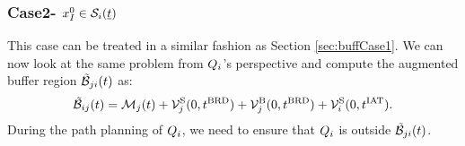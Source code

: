 \subsubsection{Case2- $x_{I}^0 \in \mathcal{S}_i(\underline{t})$} \label{sec:buffCase2}
This case can be treated in a similar fashion as Section \ref{sec:buffCase1}. We can now look at the same problem from $Q_i$'s perspective and compute the augmented buffer region $\tilde{\mathcal{B}}_{ji}(t)$ as:
\begin{equation} \label{eqn:augbuffRegion2}
\tilde{\buff}_{ij}(t) = \boset_j(t) + \brs^{\text{S}}_{j}(0, \trd) + \brs^{\text{B}}_{j}(0, \brd) + \brs^{\text{S}}_{i}(0, \iat).
\end{equation}
During the path planning of $Q_i$, we need to ensure that $Q_i$ is outside $\tilde{\mathcal{B}}_{ji}(t)$. 